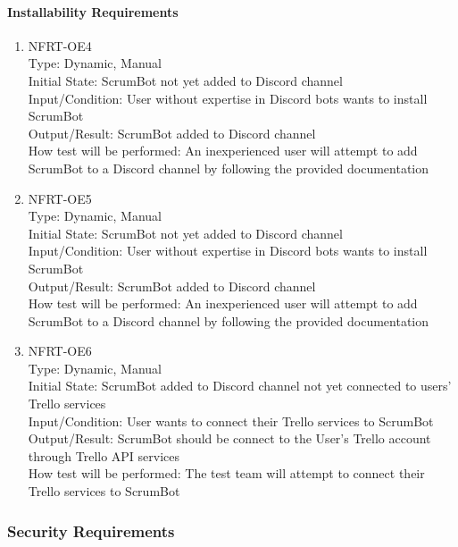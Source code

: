 \documentclass[12pt, titlepage]{article}
\begin{document}
\paragraph{Installability Requirements}
\begin{enumerate}

\item{NFRT-OE4}\\
Type: Dynamic, Manual\\
Initial State: ScrumBot not yet added to Discord channel\\
Input/Condition: User without expertise in Discord bots wants to install ScrumBot\\
Output/Result: ScrumBot added to Discord channel\\
How test will be performed: An inexperienced user will attempt to add ScrumBot to a Discord channel by following the provided documentation

\item{NFRT-OE5}\\
Type: Dynamic, Manual\\
Initial State: ScrumBot not yet added to Discord channel\\
Input/Condition: User without expertise in Discord bots wants to install ScrumBot\\
Output/Result: ScrumBot added to Discord channel\\
How test will be performed: An inexperienced user will attempt to add ScrumBot to a Discord channel by following the provided documentation

\item{NFRT-OE6}\\
Type: Dynamic, Manual\\
Initial State: ScrumBot added to Discord channel not yet connected to users' Trello services\\
Input/Condition: User wants to connect their Trello services to ScrumBot\\
Output/Result: ScrumBot should be connect to the User's Trello account through Trello API services\\
How test will be performed: The test team will attempt to connect their Trello services to ScrumBot
\end{enumerate}

\subsubsection{Security Requirements}
\end{document}
